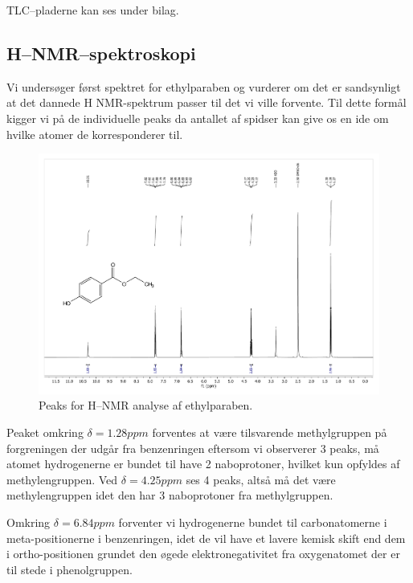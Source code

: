     TLC--pladerne kan ses under bilag.

    \subsection{H--NMR--spektroskopi}
    Vi undersøger først spektret for ethylparaben og vurderer om det er sandsynligt at det dannede H NMR-spektrum passer til det vi ville forvente. Til dette formål kigger vi på de individuelle peaks da antallet af spidser kan give os en ide om hvilke atomer de korresponderer til.
    \begin{figure}[H] \centering
        \includegraphics[width=\textwidth,page=2]{bilag/ethylnmr}
        \caption{Peaks for H--NMR analyse af ethylparaben.}
    \end{figure} 
    Peaket omkring $\delta=1.28\si{ppm}$ forventes at være tilsvarende methylgruppen på forgreningen der udgår fra benzenringen eftersom vi observerer 3 peaks, må atomet hydrogenerne er bundet til have 2 naboprotoner, hvilket kun opfyldes af methylengruppen. Ved $\delta=4.25\si{ppm}$ ses 4 peaks, altså må det være methylengruppen idet den har 3 naboprotoner fra methylgruppen. 
    
    Omkring $\delta=6.84\si{ppm}$ forventer vi hydrogenerne bundet til carbonatomerne i meta-positionerne i benzenringen, idet de vil have et lavere kemisk skift end dem i ortho-positionen grundet den øgede elektronegativitet fra oxygenatomet der er til stede i phenolgruppen.


